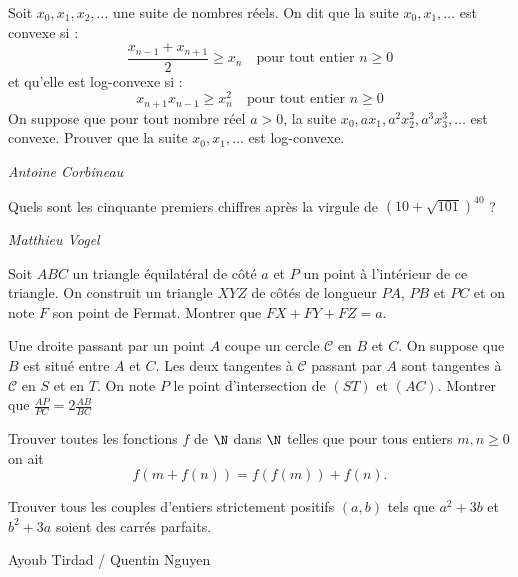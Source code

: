 \begin{exo}{}
Soit $x_0, x_1, x_2, \ldots $ une suite de nombres réels. On dit que la suite $x_0, x_1, \ldots$ est convexe si :
\[
\frac{x_{n-1}+x_{n+1}}{2}\geq x_n\quad \textrm {pour tout entier } n \geq 0
\]
et qu'elle est log-convexe si :
\[
x_{n+1}x_{n-1}\geq x_n^2\quad \textrm {pour tout entier } n \geq 0
\]
 On suppose que pour tout nombre réel $a>0$, la suite $x_0, a x_1, a^2 x_2^2, a^3 x_3^3, \ldots$ est convexe. Prouver que la suite $x_0, x_1, \ldots $ est log-convexe.

 \medskip
\textit{Antoine Corbineau}
\end{exo}



\begin{exo}{}
Quels sont les cinquante premiers chiffres après la virgule de $(10+\sqrt{101})^{40}$ ?


\medskip
\textit{Matthieu Vogel}
\end{exo}

\begin{exo}{}
Soit $ABC$ un triangle équilatéral de côté $a$ et $P$ un point à l'intérieur de ce triangle. On construit un triangle $XYZ$ de côtés de longueur $PA$, $PB$ et $PC$ et on note $F$ son point de Fermat. Montrer que $FX+FY+FZ=a$.
\end{exo}

\begin{exo}{}
Une droite passant par un point $A$ coupe un cercle $ \mathcal{C}$ en $B$ et $C$. On suppose que $B$ est situé entre $A$ et $C$. Les deux tangentes à $ \mathcal{C}$ passant par $A$ sont tangentes à $ \mathcal{C}$ en $S$ et en $T$. On note $P$ le point d'intersection de $(ST)$ et $(AC)$. Montrer que
$ \frac{AP}{PC}=2\frac{AB}{BC} $

\end{exo}

\begin{exo}{}Trouver toutes les fonctions $f$ de $ \N$ dans $ \N$ telles que pour tous entiers $m,n \geq 0$ on ait
$$f(m+f(n))=f(f(m))+f(n).$$
\end{exo}

\begin{exo}{}
Trouver tous les couples d'entiers strictement positifs $(a,b)$ tels que $a^2+3b$ et $b^2+3a$ soient des carrés parfaits.

Ayoub Tirdad / Quentin Nguyen
\end{exo}



